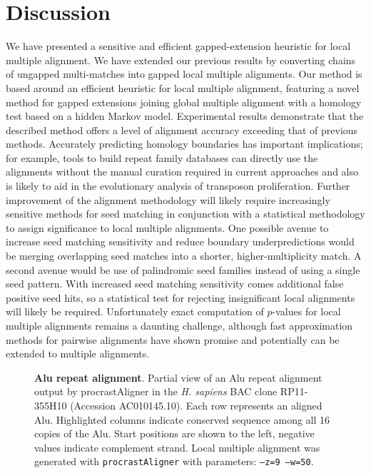 \documentclass{llncs}
\begin{document}
\section{Discussion}
We have presented a sensitive and efficient gapped-extension heuristic for local
multiple alignment. We have extended our previous results by
converting chains of ungapped multi-matches into gapped local multiple
alignments. Our method is based around an efficient heuristic for
local multiple alignment, featuring a novel method for gapped
extensions joining global multiple alignment with a homology test based on a hidden Markov
model.  Experimental results demonstrate that the
described method offers a level of alignment accuracy exceeding
that of previous methods. Accurately predicting homology boundaries has important implications; for example, tools to build repeat family databases can directly use the alignments without the manual curation required in current approaches and also is likely to aid in the evolutionary analysis of transposon proliferation.  Further improvement of the alignment
methodology will likely require increasingly sensitive methods for
seed matching in conjunction with a statistical methodology to assign
significance to local multiple alignments.  One possible avenue to
increase seed matching sensitivity and reduce boundary
underpredictions would be merging overlapping seed matches into a
shorter, higher-multiplicity match.  A second avenue would be use of
palindromic seed families instead of using a single seed
pattern. With increased seed matching sensitivity comes additional
false positive seed hits, so a statistical test for rejecting
insignificant local alignments will likely be required.  Unfortunately exact
computation of $p$-values for local multiple alignments remains a
daunting challenge, although fast approximation methods for pairwise
alignments have shown promise\cite{repseek} and potentially can be
extended to multiple alignments\cite{ref-related1,Prakash2005}.
\begin{figure}[t]
\centering {}
\vspace{-1.4cm}
\caption{\textbf{Alu repeat alignment}. Partial view of an Alu repeat alignment output by procrastAligner in the \emph{H. sapiens} BAC
clone RP11-355H10 (Accession AC010145.10). Each row represents an
aligned Alu. Highlighted columns indicate conserved sequence among all
16 copies of the Alu. Start positions are shown to the left, negative
values indicate complement strand.  Local multiple alignment was
generated with \texttt{procrastAligner} with parameters: \texttt{--z=9
--w=50}.  }
\label{fig-align}
\end{figure}\vspace{-0.2cm}
\end{document}
